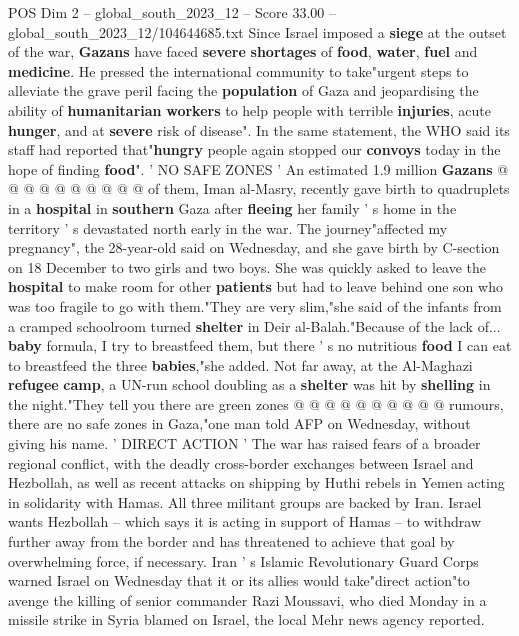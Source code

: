 \begin{textsample}{POS Dim 2 – global\_south\_2023\_12 – Score 33.00 – global\_south\_2023\_12/104644685.txt}
Since Israel imposed a \textbf{siege} at the outset of the war, \textbf{Gazans} have faced \textbf{severe} \textbf{shortages} of \textbf{food}, \textbf{water}, \textbf{fuel} and \textbf{medicine}.
He pressed the international community to take"urgent steps to alleviate the grave peril facing the \textbf{population} of Gaza and jeopardising the ability of \textbf{humanitarian} \textbf{workers} to help people with terrible \textbf{injuries}, acute \textbf{hunger}, and at \textbf{severe} risk of disease".
In the same statement, the WHO said its staff had reported that"\textbf{hungry} people again stopped our \textbf{convoys} today in the hope of finding \textbf{food}". ' NO SAFE ZONES ' An estimated 1.9 million \textbf{Gazans} @ @ @ @ @ @ @ @ @ @ of them, Iman al-Masry, recently gave birth to quadruplets in a \textbf{hospital} in \textbf{southern} Gaza after \textbf{fleeing} her family ' s home in the territory ' s devastated north early in the war.
The journey"affected my pregnancy", the 28-year-old said on Wednesday, and she gave birth by C-section on 18 December to two girls and two boys.
She was quickly asked to leave the \textbf{hospital} to make room for other \textbf{patients} but had to leave behind one son who was too fragile to go with them."They are very slim,"she said of the infants from a cramped schoolroom turned \textbf{shelter} in Deir al-Balah."Because of the lack of... \textbf{baby} formula, I try to breastfeed them, but there ' s no nutritious \textbf{food} I can eat to breastfeed the three \textbf{babies},"she added.
Not far away, at the Al-Maghazi \textbf{refugee} \textbf{camp}, a UN-run school doubling as a \textbf{shelter} was hit by \textbf{shelling} in the night."They tell you there are green zones @ @ @ @ @ @ @ @ @ @ rumours, there are no safe zones in Gaza,"one man told AFP on Wednesday, without giving his name. ' DIRECT ACTION ' The war has raised fears of a broader regional conflict, with the deadly cross-border exchanges between Israel and Hezbollah, as well as recent attacks on shipping by Huthi rebels in Yemen acting in solidarity with Hamas.
All three militant groups are backed by Iran.
Israel wants Hezbollah -- which says it is acting in support of Hamas -- to withdraw further away from the border and has threatened to achieve that goal by overwhelming force, if necessary.
Iran ' s Islamic Revolutionary Guard Corps warned Israel on Wednesday that it or its allies would take"direct action"to avenge the killing of senior commander Razi Moussavi, who died Monday in a missile strike in Syria blamed on Israel, the local Mehr news agency reported.

\end{textsample}
